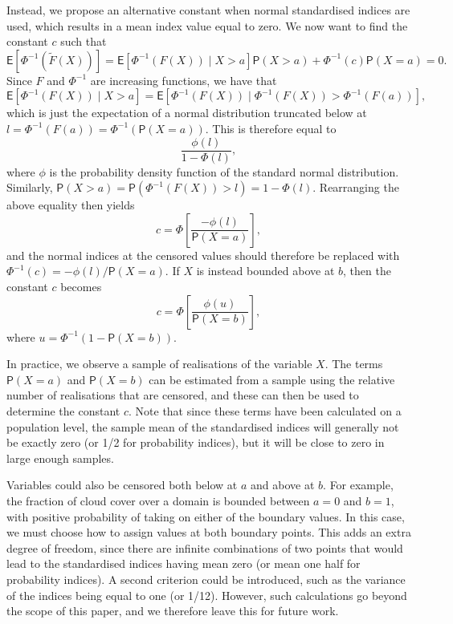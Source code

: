 Instead, we propose an alternative constant when normal standardised indices are used, which results in a mean index value equal to zero. We now want to find the constant \(c\) such that
\[
\mathsf{E}[\Phi^{-1}(\tilde{F}(X))] = \mathsf{E}[\Phi^{-1}(F(X)) \mid X > a]\mathsf{P}(X > a) + \Phi^{-1}(c) \mathsf{P}(X = a) = 0.
\]
Since \(F\) and \(\Phi^{-1}\) are increasing functions, we have that
\[
\mathsf{E}[\Phi^{-1}(F(X)) \mid X > a] = \mathsf{E}[\Phi^{-1}(F(X)) \mid \Phi^{-1}(F(X)) > \Phi^{-1}(F(a))],
\]
which is just the expectation of a normal distribution truncated below at \(l = \Phi^{-1}(F(a)) = \Phi^{-1}(\mathsf{P}(X = a))\). This is therefore equal to
\[
\frac{\phi(l)}{1 - \Phi(l)},
\]
where \(\phi\) is the probability density function of the standard normal distribution. Similarly, \(\mathsf{P}(X > a) = \mathsf{P}(\Phi^{-1}(F(X)) > l) = 1 - \Phi(l)\). Rearranging the above equality then yields
\[
c = \Phi \left[ \frac{-\phi(l)}{\mathsf{P}(X = a)} \right],
\]
and the normal indices at the censored values should therefore be replaced with \(\Phi^{-1}(c) = -\phi(l) / \mathsf{P}(X = a)\). If \(X\) is instead bounded above at \(b\), then the constant \(c\) becomes
\[
c = \Phi \left[ \frac{\phi(u)}{\mathsf{P}(X = b)} \right],
\]
where \(u = \Phi^{-1}(1 - \mathsf{P}(X = b))\).

In practice, we observe a sample of realisations of the variable \(X\). The terms \(\mathsf{P}(X = a)\) and \(\mathsf{P}(X = b)\) can be estimated from a sample using the relative number of realisations that are censored, and these can then be used to determine the constant \(c\). Note that since these terms have been calculated on a population level, the sample mean of the standardised indices will generally not be exactly zero (or 1/2 for probability indices), but it will be close to zero in large enough samples.

Variables could also be censored both below at \(a\) and above at \(b\). For example, the fraction of cloud cover over a domain is bounded between \(a = 0\) and \(b = 1\), with positive probability of taking on either of the boundary values. In this case, we must choose how to assign values at both boundary points. This adds an extra degree of freedom, since there are infinite combinations of two points that would lead to the standardised indices having mean zero (or mean one half for probability indices). A second criterion could be introduced, such as the variance of the indices being equal to one (or 1/12). However, such calculations go beyond the scope of this paper, and we therefore leave this for future work.

